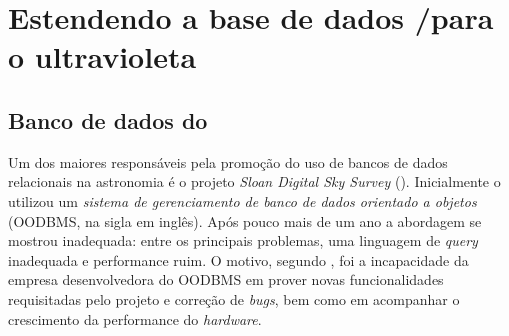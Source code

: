 


\chapter{Estendendo a base de dados \SDSS/\STARLIGHT para o ultravioleta}
\label{sec:Crossmatch}



\section{Banco de dados do \SDSS}

Um dos maiores responsáveis pela promoção do uso de bancos de dados relacionais
na astronomia é o projeto {\em Sloan Digital Sky Survey} (\SDSS). Inicialmente o
\SDSS utilizou um {\em sistema de gerenciamento de banco de dados orientado a
objetos} \citep{Maier1986} (OODBMS, na sigla em inglês). Após pouco mais de um
ano a abordagem se mostrou inadequada: entre os principais problemas, uma
linguagem de {\em query} inadequada e performance ruim. O motivo, segundo
\citet{Thakar2004}, foi a incapacidade da empresa desenvolvedora do OODBMS em
prover novas funcionalidades requisitadas pelo projeto e correção de {\em bugs},
bem como em acompanhar o crescimento da performance do {\em hardware}.

